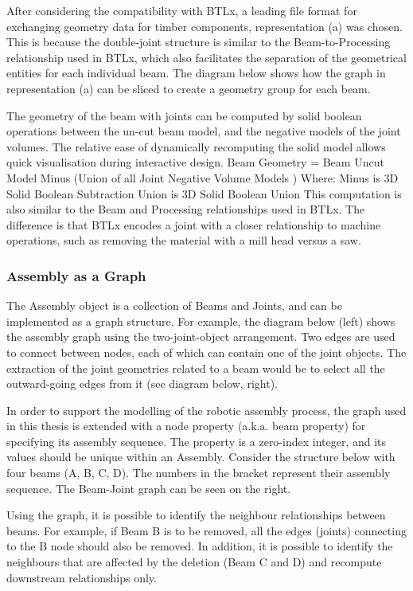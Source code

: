 After considering the compatibility with BTLx, a leading file format for exchanging geometry data for timber components, representation (a) was chosen. This is because the double-joint structure is similar to the Beam-to-Processing relationship used in BTLx, which also facilitates the separation of the geometrical entities for each individual beam. The diagram below shows how the graph in representation (a) can be sliced to create a geometry group for each beam.

The geometry of the beam with joints can be computed by solid boolean operations between the un-cut beam model, and the negative models of the joint volumes. The relative ease of dynamically recomputing the solid model allows quick visualisation during interactive design.
Beam Geometry = Beam Uncut Model Minus (Union of all Joint Negative Volume Models )
Where: 
Minus is 3D Solid Boolean Subtraction
Union is 3D Solid Boolean Union
This computation is also similar to the Beam and Processing relationships used in BTLx. The difference is that BTLx encodes a joint with a closer relationship to machine operations, such as removing the material with a mill head versus a saw.

\subsubsection{Assembly as a Graph}
The Assembly object is a collection of Beams and Joints, and can be implemented as a graph structure. For example, the diagram below (left) shows the assembly graph using the two-joint-object arrangement. Two edges are used to connect between nodes, each of which can contain one of the joint objects. The extraction of the joint geometries related to a beam would be to select all the outward-going edges from it (see diagram below, right).

In order to support the modelling of the robotic assembly process, the graph used in this thesis is extended with a node property (a.k.a. beam property) for specifying its assembly sequence. The property is a zero-index integer, and its values should be unique within an Assembly. Consider the structure below with four beams (A, B, C, D). The numbers in the bracket represent their assembly sequence. The Beam-Joint graph can be seen on the right.

Using the graph, it is possible to identify the neighbour relationships between beams. For example, if Beam B is to be removed, all the edges (joints) connecting to the B node should also be removed. In addition, it is possible to identify the neighbours that are affected by the deletion (Beam C and D) and recompute downstream relationships only. 

